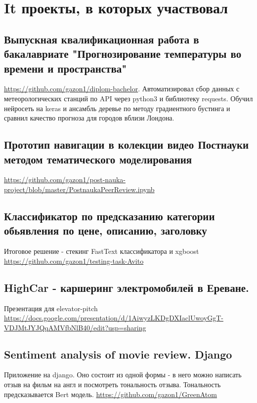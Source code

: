 \documentclass[11pt]{article}
\begin{document}
\section{It проекты, в которых участвовал}
\label{sec:orgc5efe9f}
\subsection{Выпускная квалификационная работа в бакалавриате "Прогнозирование температуры во времени и пространства"}
\label{sec:org8c5795e}
\url{https://github.com/gazon1/diplom-bachelor}. Автоматизировал сбор данных с метеорологических станций по API через python3 и библиотеку requests. Обучил нейросеть на keras и ансамбль деревье по методу градиентного бустинга и сравнил качество прогноза для городов вблизи Лондона.

\subsection{Прототип навигации в колекции видео Постнауки методом тематического моделирования}
\label{sec:orge025a84}
\url{https://github.com/gazon1/post-nauka-project/blob/master/PostnaukaPeerReview.ipynb}

\subsection{Классификатор по предсказанию категории обьявления по цене, описанию, заголовку}
\label{sec:orgcc9c9d3}
Итоговое решение - стекинг FastText классификатора и xgboost
\url{https://github.com/gazon1/testing-task-Avito}

\subsection{HighCar - каршеринг электромобилей в Ереване.}
\label{sec:org08b329d}
Презентация для elevator-pitch \url{https://docs.google.com/presentation/d/1AiwyzLKDgDXIaclUwoyGgT-VDJMtJYJQqAMVfbNlB40/edit?usp=sharing}

\subsection{Sentiment analysis of movie review. Django}
\label{sec:orgcb2cfb6}
Приложение на django. Оно состоит из одной формы - в него можно написать
отзыв на фильм на англ и посмотреть тональность отзыва. Тональность предсказывается
Bert модель.
\url{https://github.com/gazon1/GreenAtom}
\end{document}
